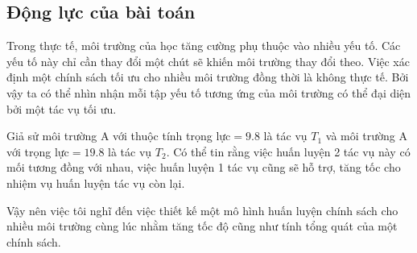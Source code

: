 \label{sec:multitask-rl}
\subsection{Động lực của bài toán}
Trong thực tế, môi trường của học tăng cường phụ thuộc vào nhiều yếu tố. Các yếu tố này chỉ cần thay đổi một chút sẽ khiến môi trường thay đổi theo. Việc xác định một chính sách tối ưu cho nhiều môi trường đồng thời là không thực tế. Bởi vậy ta có thể nhìn nhận mỗi tập yếu tố tương ứng của môi trường có thể đại diện bởi một tác vụ tối ưu. 

Giả sử môi trường A với thuộc tính trọng lực$=9.8$ là tác vụ $T_1$ và môi trường A với trọng lực$=19.8$ là tác vụ $T_2$. Có thể tin rằng việc huấn luyện 2 tác vụ này có mối tương đồng với nhau, việc huấn luyện 1 tác vụ cũng sẽ hỗ trợ, tăng tốc cho nhiệm vụ huấn luyện tác vụ còn lại.

Vậy nên việc tôi nghĩ đến việc thiết kế một mô hình huấn luyện chính sách cho nhiều môi trường cùng lúc nhằm tăng tốc độ cũng như tính tổng quát của một chính sách. 

